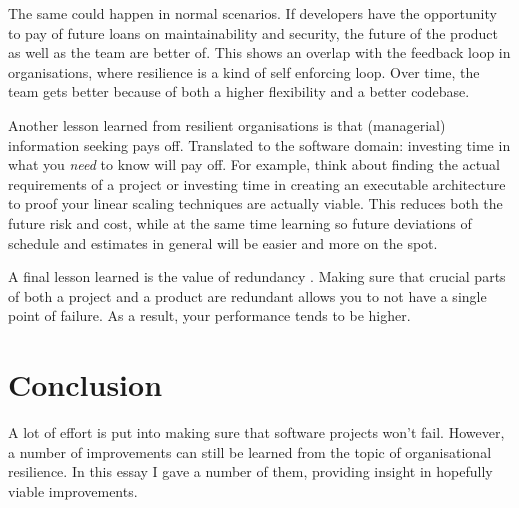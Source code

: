 The same could happen in normal scenarios. 
If developers have the opportunity to pay of future loans on maintainability and security, the future of the product as well as the team are better of. 
This shows an overlap with the feedback loop in organisations, where resilience is a kind of self enforcing loop.
Over time, the team gets better because of both a higher flexibility and a better codebase.

Another lesson learned from resilient organisations is that (managerial) information seeking pays off. 
Translated to the software domain: investing time in what you \emph{need} to know will pay off.
For example, think about finding the actual requirements of a project or investing time in creating an executable architecture to proof your linear scaling techniques are actually viable. 
This reduces both the future risk and cost, while at the same time learning so future deviations of schedule and estimates in general will be easier and more on the spot.

A final lesson learned is the value of redundancy \cite{zhang2010principle}.
Making sure that crucial parts of both a project and a product are redundant allows you to not have a single point of failure. 
As a result, your performance tends to be higher.

\section{Conclusion}
A lot of effort is put into making sure that software projects won't fail.
However, a number of improvements can still be learned from the topic of organisational resilience.
In this essay I gave a number of them, providing insight in hopefully viable improvements. 
